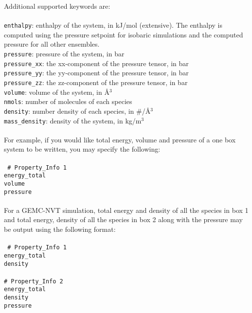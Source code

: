 Additional supported keywords are: \\ \\
\texttt{enthalpy}: enthalpy of the system, in kJ/mol (extensive). 
The enthalpy is computed using the pressure setpoint for isobaric simulations and 
the computed pressure for all other ensembles. \\
\texttt{pressure}: pressure of the system, in bar \\
\texttt{pressure\_xx}: the xx-component of the pressure tensor, in bar \\
\texttt{pressure\_yy}: the yy-component of the pressure tensor, in bar \\
\texttt{pressure\_zz}: the zz-component of the pressure tensor, in bar \\
\texttt{volume}: volume of the system, in \AA$^3$ \\
\texttt{nmols}: number of molecules of each species \\
\texttt{density}: number density of each species, in \#/\AA$^3$ \\
\texttt{mass\_density}: density of the system, in kg/m$^3$ \\ \\
%
For example, if you would like total energy, volume and pressure of a one box system to be written, you may 
specify the following: \\ \\
%
\texttt{
\# Property\_Info 1 \\
energy\_total \\ 
volume \\ 
pressure \\ \\}
%
For a GEMC-NVT simulation, total energy and density of all the species in box 1 and total energy, density of
all the species in box 2 along with the pressure may be output using the following format: \\ \\
%
\texttt{
\# Property\_Info 1 \\
energy\_total \\
density \\ \\
%
\# Property\_Info 2 \\
energy\_total \\
density \\ 
pressure }
%
%
%
